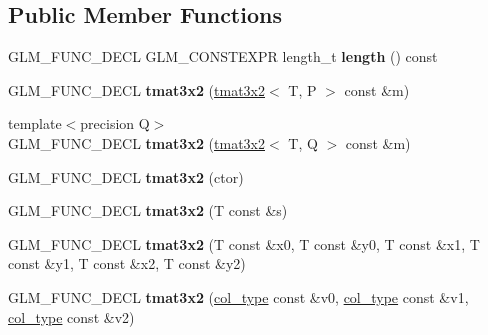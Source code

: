 \subsection*{Public Member Functions}
\begin{DoxyCompactItemize}
\item 
G\+L\+M\+\_\+\+F\+U\+N\+C\+\_\+\+D\+E\+CL G\+L\+M\+\_\+\+C\+O\+N\+S\+T\+E\+X\+PR length\+\_\+t {\bfseries length} () const \hypertarget{structglm_1_1detail_1_1tmat3x2_a94cfff914769606a6ecad275a1b4bb46}{}\label{structglm_1_1detail_1_1tmat3x2_a94cfff914769606a6ecad275a1b4bb46}

\item 
G\+L\+M\+\_\+\+F\+U\+N\+C\+\_\+\+D\+E\+CL {\bfseries tmat3x2} (\hyperlink{structglm_1_1detail_1_1tmat3x2}{tmat3x2}$<$ T, P $>$ const \&m)\hypertarget{structglm_1_1detail_1_1tmat3x2_ad4a1aebc83113727a6ff015cf870fbf3}{}\label{structglm_1_1detail_1_1tmat3x2_ad4a1aebc83113727a6ff015cf870fbf3}

\item 
{\footnotesize template$<$precision Q$>$ }\\G\+L\+M\+\_\+\+F\+U\+N\+C\+\_\+\+D\+E\+CL {\bfseries tmat3x2} (\hyperlink{structglm_1_1detail_1_1tmat3x2}{tmat3x2}$<$ T, Q $>$ const \&m)\hypertarget{structglm_1_1detail_1_1tmat3x2_a293a68738c817050bcccf356d1c36171}{}\label{structglm_1_1detail_1_1tmat3x2_a293a68738c817050bcccf356d1c36171}

\item 
G\+L\+M\+\_\+\+F\+U\+N\+C\+\_\+\+D\+E\+CL {\bfseries tmat3x2} (ctor)\hypertarget{structglm_1_1detail_1_1tmat3x2_a370b3101c031c0789fe0a6fb33f5c13a}{}\label{structglm_1_1detail_1_1tmat3x2_a370b3101c031c0789fe0a6fb33f5c13a}

\item 
G\+L\+M\+\_\+\+F\+U\+N\+C\+\_\+\+D\+E\+CL {\bfseries tmat3x2} (T const \&s)\hypertarget{structglm_1_1detail_1_1tmat3x2_ab469e328c7d856fc0b999e9bc3c512e8}{}\label{structglm_1_1detail_1_1tmat3x2_ab469e328c7d856fc0b999e9bc3c512e8}

\item 
G\+L\+M\+\_\+\+F\+U\+N\+C\+\_\+\+D\+E\+CL {\bfseries tmat3x2} (T const \&x0, T const \&y0, T const \&x1, T const \&y1, T const \&x2, T const \&y2)\hypertarget{structglm_1_1detail_1_1tmat3x2_a680eecd8662a43d6f873da7c2577e7a2}{}\label{structglm_1_1detail_1_1tmat3x2_a680eecd8662a43d6f873da7c2577e7a2}

\item 
G\+L\+M\+\_\+\+F\+U\+N\+C\+\_\+\+D\+E\+CL {\bfseries tmat3x2} (\hyperlink{structglm_1_1detail_1_1tvec2}{col\+\_\+type} const \&v0, \hyperlink{structglm_1_1detail_1_1tvec2}{col\+\_\+type} const \&v1, \hyperlink{structglm_1_1detail_1_1tvec2}{col\+\_\+type} const \&v2)\hypertarget{structglm_1_1detail_1_1tmat3x2_af83457c3dde2ca170e71eed84c60338c}{}\label{structglm_1_1detail_1_1tmat3x2_af83457c3dde2ca170e71eed84c60338c}


\end{DoxyCompactItemize}
